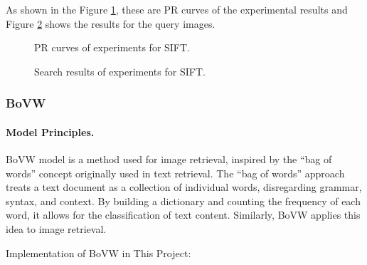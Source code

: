 \documentclass{article}
\begin{document}
As shown in the Figure \ref{fig:SIFTPR}, these are PR curves of the experimental results and Figure \ref{fig:SIFTResult} shows the results for the query images.

\begin{figure}[!tbp]
  \centering
  \hfill
  \hfill
  \caption{\label{fig:SIFTPR} PR curves of experiments for SIFT.}
\end{figure}

\begin{figure}[!tbp]
  \centering
  \hfill
  \hfill
  \caption{\label{fig:SIFTResult} Search results of experiments for SIFT.}
\end{figure}

\subsubsection{BoVW}

\paragraph{Model Principles.}
BoVW model is a method used for image retrieval, inspired by the “bag of words” concept originally used in text retrieval. The “bag of words” approach treats a text document as a collection of individual words, disregarding grammar, syntax, and context. By building a dictionary and counting the frequency of each word, it allows for the classification of text content. Similarly, BoVW applies this idea to image retrieval.

Implementation of BoVW in This Project:
\end{document}
